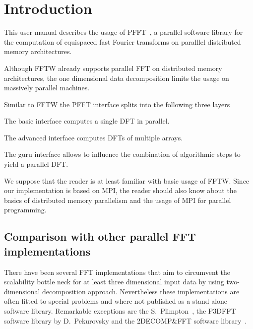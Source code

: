 \chapter{Introduction}\label{chap:intro}
This user manual describes the usage of PFFT~\pfftversion, a parallel software library for the
computation of equispaced fast Fourier transforms on paralllel distributed memory architectures.

Although FFTW already supports parallel FFT on distributed memory architectures, the one dimensional
data decomposition limits the usage on massively parallel machines.

Similar to FFTW the PFFT interface splits into the following three layers
\begin{compactitem}
  \item The basic interface computes a single DFT in parallel.
  \item The advanced interface computes DFTs of multiple arrays.
  \item The guru interface allows to influence the combination of algorithmic steps to yield a parallel DFT.
\end{compactitem}

We suppose that the reader is at least familiar with basic usage of FFTW. Since our implementation is based on
MPI, the reader should also know about the basics of distributed memory parallelism and the usage of MPI for parallel
programming.




\section{Comparison with other parallel FFT implementations}

There have been several FFT implementations that aim to circumvent the scalability bottle neck
for at least three dimensional input data by using two-dimensional decomposition approach.
Nevertheless these implementations are often fitted to special problems and where not published
as a stand alone software library. Remarkable exceptions are the S.~Plimpton~\cite{libsandiafft},
the P3DFFT~\cite{libp3dfft} software library by D.~Pekurovsky and the \mbox{2DECOMP\&FFT} software library~\cite{Li2010, lib2decompfft}.



